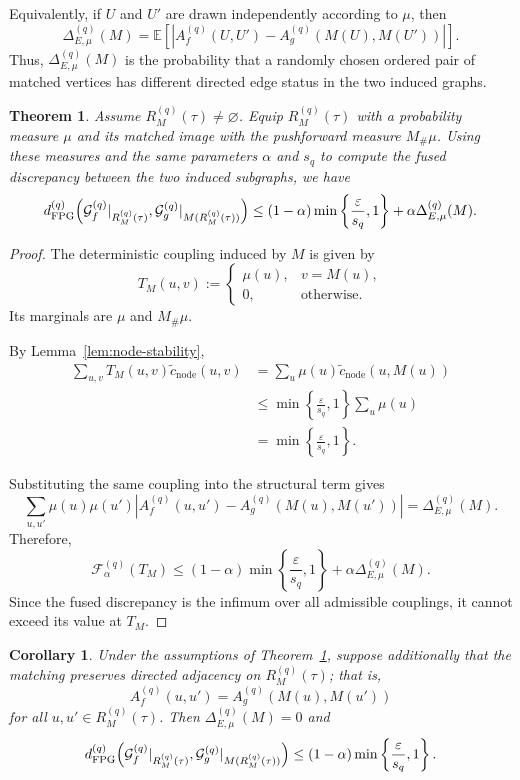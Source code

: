 \documentclass[11pt]{article}
\theoremstyle{paperdefinition}
\theoremstyle{paperplain}
\newtheorem{theorem}[definition]{Theorem}
\newtheorem{corollary}[definition]{Corollary}
\theoremstyle{paperremark}
\begin{document}
Equivalently, if $U$ and $U'$ are drawn independently according to $\mu$, then
\[
\Delta_{E,\mu}^{(q)}(M) = \mathbb E \left[ \left| A_f^{(q)}(U,U') - A_g^{(q)}(M(U),M(U')) \right| \right].
\]
Thus, $\Delta_{E,\mu}^{(q)}(M)$ is the probability that a randomly chosen ordered pair of matched vertices has different directed edge status in the two induced graphs.

\begin{theorem}
\label{thm:matched-subgraph-bound}
Assume $R_M^{(q)}(\tau)\neq\varnothing$. Equip $R_M^{(q)}(\tau)$ with a probability measure $\mu$ and its matched image with the pushforward measure $M_\#\mu$.
Using these measures and the same parameters $\alpha$ and $s_q$ to compute the fused discrepancy between the two induced subgraphs, we have
\[
d_{\mathrm{FPG}}^{(q)}\Bigl(\mathcal G_f^{(q)}|_{R_M^{(q)}(\tau)}, \mathcal G_g^{(q)}|_{M(R_M^{(q)}(\tau))}\Bigr) \leq (1-\alpha) \min\left\{\frac{\varepsilon}{s_q}, 1 \right\}
+ \alpha \Delta_{E,\mu}^{(q)}(M).
\]
\end{theorem}

\begin{proof}
The deterministic coupling induced by $M$ is given by
\[
T_M(u,v) :=
\begin{cases}
\mu(u), & v=M(u),\\
0, & \text{otherwise}.
\end{cases}
\]
Its marginals are $\mu$ and $M_\#\mu$.

By Lemma~\ref{lem:node-stability},
\[
\begin{aligned}
\sum_{u,v} T_M(u,v) \widetilde c_{\mathrm{node}}(u,v) &= \sum_u \mu(u) \widetilde c_{\mathrm{node}}(u,M(u))\\
&\leq\min\left\{\frac{\varepsilon}{s_q}, 1\right\}\sum_u\mu(u)\\
&= \min\left\{\frac{\varepsilon}{s_q}, 1\right\}.
\end{aligned}
\]

Substituting the same coupling into the structural term gives
\[
\sum_{u,u'}\mu(u)\mu(u')\left|A_f^{(q)}(u,u') - A_g^{(q)}(M(u),M(u'))\right| = \Delta_{E,\mu}^{(q)}(M).
\]
Therefore,
\[
\mathcal F_\alpha^{(q)}(T_M) \leq (1-\alpha)\min\left\{\frac{\varepsilon}{s_q}, 1\right\} + \alpha\Delta_{E,\mu}^{(q)}(M).
\]
Since the fused discrepancy is the infimum over all admissible couplings, it cannot exceed its value at $T_M$.
\end{proof}

\begin{corollary}
\label{cor:edge-preserved-bound}
Under the assumptions of Theorem~\ref{thm:matched-subgraph-bound}, suppose additionally that the matching preserves directed adjacency on $R_M^{(q)}(\tau)$; that is,
\[
A_f^{(q)}(u,u') = A_g^{(q)}(M(u),M(u'))
\]
for all $u,u'\in R_M^{(q)}(\tau)$. Then $\Delta_{E,\mu}^{(q)}(M)=0$ and
\[
d_{\mathrm{FPG}}^{(q)}\Bigl(\mathcal G_f^{(q)}|_{R_M^{(q)}(\tau)}, \mathcal G_g^{(q)}|_{M(R_M^{(q)}(\tau))}\Bigr) \leq (1-\alpha)\min\left\{\frac{\varepsilon}{s_q}, 1 \right\}.
\]
\end{corollary}
\end{document}

